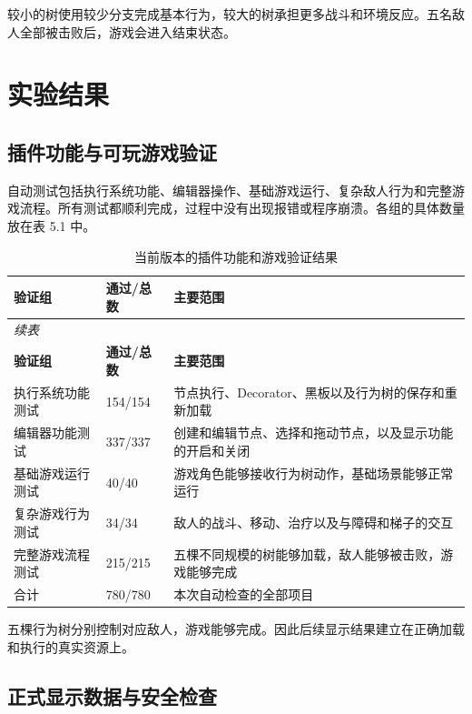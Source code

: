 \documentclass[11pt,a4paper,oneside,extrafontsizes]{memoir}
\begin{document}
较小的树使用较少分支完成基本行为，较大的树承担更多战斗和环境反应。五名敌人全部被击败后，游戏会进入结束状态。

\chapter{实验结果}

\section{插件功能与可玩游戏验证}

自动测试包括执行系统功能、编辑器操作、基础游戏运行、复杂敌人行为和完整游戏流程。所有测试都顺利完成，过程中没有出现报错或程序崩溃。各组的具体数量放在表 5.1 中。

\begin{center}
\small
\begin{longtable}{@{}p{} p{} p{}@{}}
\caption{当前版本的插件功能和游戏验证结果}\label{tab:auto-6}\\
\toprule
\textbf{验证组} & \textbf{通过/总数} & \textbf{主要范围} \\
\midrule
\endfirsthead
\multicolumn{3}{l}{\small\itshape 续表}\\
\toprule
\textbf{验证组} & \textbf{通过/总数} & \textbf{主要范围} \\
\midrule
\endhead
执行系统功能测试 & 154/154 & 节点执行、Decorator、黑板以及行为树的保存和重新加载 \\
编辑器功能测试 & 337/337 & 创建和编辑节点、选择和拖动节点，以及显示功能的开启和关闭 \\
基础游戏运行测试 & 40/40 & 游戏角色能够接收行为树动作，基础场景能够正常运行 \\
复杂游戏行为测试 & 34/34 & 敌人的战斗、移动、治疗以及与障碍和梯子的交互 \\
完整游戏流程测试 & 215/215 & 五棵不同规模的树能够加载，敌人能够被击败，游戏能够完成 \\
合计 & 780/780 & 本次自动检查的全部项目 \\
\bottomrule
\end{longtable}
\end{center}

五棵行为树分别控制对应敌人，游戏能够完成。因此后续显示结果建立在正确加载和执行的真实资源上。

\section{正式显示数据与安全检查}
\end{document}
